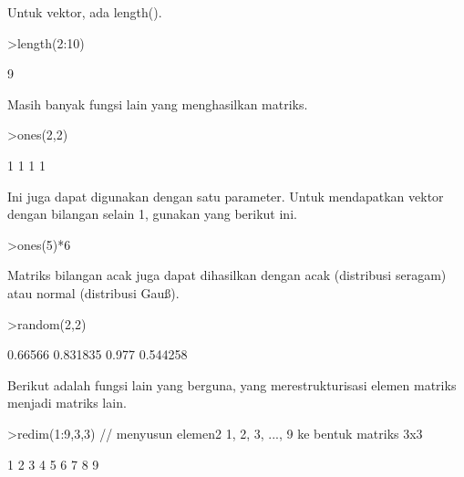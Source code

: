 \begin{eulernotebook}
\begin{eulercomment}
\begin{eulercomment}
\begin{eulercomment}
Untuk vektor, ada length().
\end{eulercomment}
\begin{eulerprompt}
>length(2:10)
\end{eulerprompt}
\begin{euleroutput}
  9
\end{euleroutput}
\begin{eulercomment}
Masih banyak fungsi lain yang menghasilkan matriks.
\end{eulercomment}
\begin{eulerprompt}
>ones(2,2)
\end{eulerprompt}
\begin{euleroutput}
              1             1 
              1             1 
\end{euleroutput}
\begin{eulercomment}
Ini juga dapat digunakan dengan satu parameter. Untuk mendapatkan
vektor dengan bilangan selain 1, gunakan yang berikut ini.
\end{eulercomment}
\begin{eulerprompt}
>ones(5)*6
\end{eulerprompt}
\begin{euleroutput}
  [6,  6,  6,  6,  6]
\end{euleroutput}
\begin{eulercomment}
Matriks bilangan acak juga dapat dihasilkan dengan acak (distribusi
seragam) atau normal (distribusi Gauß).
\end{eulercomment}
\begin{eulerprompt}
>random(2,2)
\end{eulerprompt}
\begin{euleroutput}
        0.66566      0.831835 
          0.977      0.544258 
\end{euleroutput}
\begin{eulercomment}
Berikut adalah fungsi lain yang berguna, yang merestrukturisasi elemen
matriks menjadi matriks lain.
\end{eulercomment}
\begin{eulerprompt}
>redim(1:9,3,3) // menyusun elemen2 1, 2, 3, ..., 9 ke bentuk matriks 3x3
\end{eulerprompt}
\begin{euleroutput}
              1             2             3 
              4             5             6 
              7             8             9 
\end{euleroutput}
\begin{eulercomment}

\end{eulercomment}
\end{eulercomment}
\end{eulercomment}
\end{eulernotebook}
